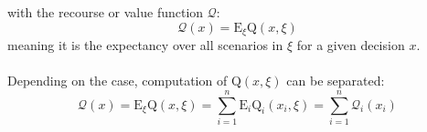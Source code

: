 \documentclass[12pt]{article}
\begin{document}
with the recourse or value function $\mathcal{Q}$:
\begin{equation}
\mathcal{Q}(x) = \mathrm{E}_{\xi} \mathrm{Q}(x,\xi)
\end{equation}
meaning it is the expectancy over all scenarios in $\xi$ for a given decision $x$.\\
\\
Depending on the case, computation of $\mathrm{Q}(x,\xi)$ can be separated:\\
\begin{equation}
\mathcal{Q}(x) = \mathrm{E}_{\xi} \mathrm{Q}(x,\xi) = \sum\limits_{i=1}^{n} \mathrm{E}_i \mathrm{Q}_i(x_i,\xi) = \sum\limits_{i=1}^{n} \mathcal{Q}_i(x_i)
\end{equation}
\end{document}

